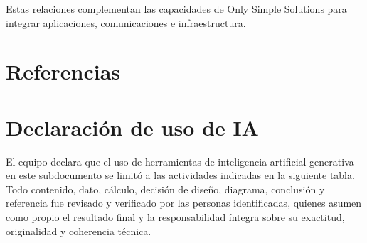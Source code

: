 \documentclass[11pt]{article}
\begin{document}
Estas relaciones complementan las capacidades de Only Simple Solutions para integrar aplicaciones, comunicaciones e infraestructura.

\section*{Referencias}

\section*{Declaración de uso de IA}

El equipo declara que el uso de herramientas de inteligencia artificial generativa en este subdocumento se limitó a las actividades indicadas en la siguiente tabla. Todo contenido, dato, cálculo, decisión de diseño, diagrama, conclusión y referencia fue revisado y verificado por las personas identificadas, quienes asumen como propio el resultado final y la responsabilidad íntegra sobre su exactitud, originalidad y coherencia técnica.
\end{document}
